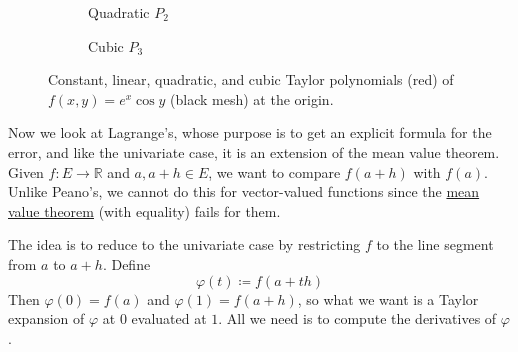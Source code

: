 \begin{example}
\begin{figure}[H]
    \begin{subfigure}[b]{0.48\textwidth}
      \centering
      \caption{Quadratic $P_2$}
    \end{subfigure}
    \hfill
    \begin{subfigure}[b]{0.48\textwidth}
      \centering
      \caption{Cubic $P_3$}
    \end{subfigure}
      \caption{Constant, linear, quadratic, and cubic Taylor polynomials (red) of $f(x, y) = e^x \cos y$ (black mesh) at the origin.}
      \label{fig:taylor-polynomials-of-exp-cos}
    \end{figure}
  \end{example}


  Now we look at Lagrange's, whose purpose is to get an explicit formula for the error, and like the univariate case, it is an extension of the mean value theorem. Given $f: E \to \mathbb{R}$ and $a, a + h \in E$, we want to compare $f(a + h)$ with $f(a)$. Unlike Peano's, we cannot do this for vector-valued functions since the \hyperref[real-thm:mvt]{mean value theorem} (with equality) fails for them. 

  The idea is to reduce to the univariate case by restricting $f$ to the line segment from $a$ to $a + h$. Define 
  \begin{equation}
    \varphi(t) \coloneqq f(a + th)
  \end{equation}
  Then $\varphi(0) = f(a)$ and $\varphi(1) = f(a + h)$, so what we want is a Taylor expansion of $\varphi$ at $0$ evaluated at $1$. All we need is to compute the derivatives of $\varphi$. 

